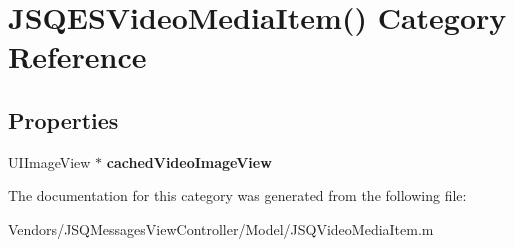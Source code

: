 \hypertarget{category_j_s_q_e_s_video_media_item_07_08}{}\section{J\+S\+Q\+E\+S\+Video\+Media\+Item() Category Reference}
\label{category_j_s_q_e_s_video_media_item_07_08}
\subsection*{Properties}
\begin{DoxyCompactItemize}
\item 
\hypertarget{category_j_s_q_e_s_video_media_item_07_08_aaeee1f5a1268d3b89ba691d6906bafa2}{}U\+I\+Image\+View $\ast$ {\bfseries cached\+Video\+Image\+View}\label{category_j_s_q_e_s_video_media_item_07_08_aaeee1f5a1268d3b89ba691d6906bafa2}

\end{DoxyCompactItemize}


The documentation for this category was generated from the following file\+:\begin{DoxyCompactItemize}
\item 
Vendors/\+J\+S\+Q\+Messages\+View\+Controller/\+Model/J\+S\+Q\+Video\+Media\+Item.\+m\end{DoxyCompactItemize}

